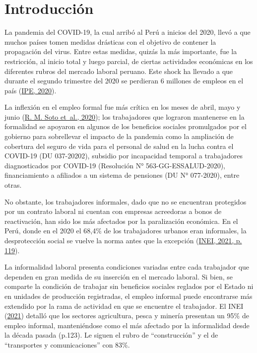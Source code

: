 \documentclass[
  letterpaper,
  12pt,
  oneside,
  spanish,
  doublespacing,
  headsepline,
  parskip]{MastersDoctoralThesis}
\begin{document}

\hypertarget{introducciuxf3n}{%
\chapter*{Introducción}\label{introducciuxf3n}}


La pandemia del COVID-19, la cual arribó al Perú a inicios del 2020,
llevó a que muchos países tomen medidas drásticas con el objetivo de
contener la propagación del virus. Entre estas medidas, quizás la más
importante, fue la restricción, al inicio total y luego parcial, de
ciertas actividades económicas en los diferentes rubros del mercado
laboral peruano. Este shock ha llevado a que durante el segundo
trimestre del 2020 se perdieran 6 millones de empleos en el país
(\protect\hyperlink{ref-ipe2020}{IPE, 2020}).

La inflexión en el empleo formal fue más crítica en los meses de abril,
mayo y junio (\protect\hyperlink{ref-soto2020}{R. M. Soto et~al.,
2020}); los trabajadores que lograron mantenerse en la formalidad se
apoyaron en algunos de los beneficios sociales promulgados por el
gobierno para sobrellevar el impacto de la pandemia como la ampliación
de cobertura del seguro de vida para el personal de salud en la lucha
contra el COVID-19 (DU 037-20202), subsidio por incapacidad temporal a
trabajadores diagnosticados por COVID-19 (Resolución N°
563-GG-ESSALUD-2020), financiamiento a afiliados a un sistema de
pensiones (DU N° 077-2020), entre otras.

No obstante, los trabajadores informales, dado que no se encuentran
protegidos por un contrato laboral ni cuentan con empresas acreedoras a
bonos de reactivación, han sido los más afectados por la paralización
económica. En el Perú, donde en el 2020 el 68,4\% de los trabajadores
urbanos eran informales, la desprotección social se vuelve la norma
antes que la excepción (\protect\hyperlink{ref-inei2021}{INEI, 2021, p.
119}).

La informalidad laboral presenta condiciones variadas entre cada
trabajador que dependen en gran medida de su inserción en el mercado
laboral. Si bien, se comparte la condición de trabajar sin beneficios
sociales reglados por el Estado ni en unidades de producción
registradas, el empleo informal puede encontrarse más extendido por la
rama de actividad en que se encuentre el trabajador. El INEI
(\protect\hyperlink{ref-inei2021}{2021}) detalló que los sectores
agricultura, pesca y minería presentan un 95\% de empleo informal,
manteniéndose como el más afectado por la informalidad desde la década
pasada (p.123). Le siguen el rubro de ``construcción'' y el de
``transportes y comunicaciones'' con 83\%.
\end{document}

